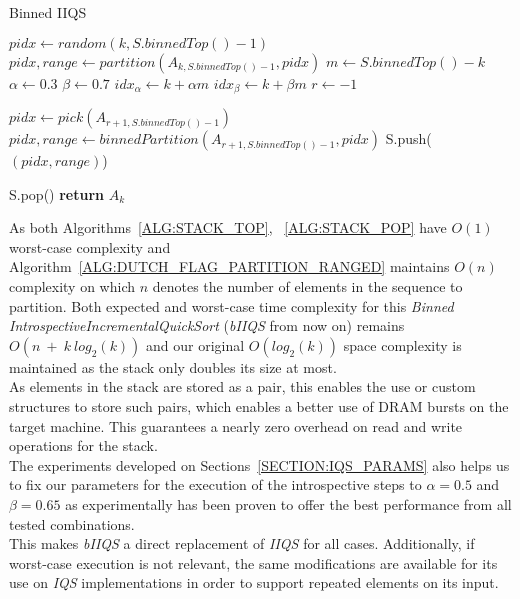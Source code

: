 \begin{algorithm}
  \begin{algorithmic}[1]
    \caption{Binned IIQS} \label{ALG:RANGED_IIQS}
        \State $pidx \gets random(k,S.binnedTop()-1)$
        \State $pidx, range \gets partition(A_{k,S.binnedTop()-1}, pidx)$
        \State $m \gets S.binnedTop() - k$
        \State $\alpha \gets 0.3$
        \State $\beta \gets 0.7$
        \State $idx_\alpha \gets k + \alpha m$
        \State $idx_\beta \gets k + \beta m$
        \State $r \gets -1$

            \State $pidx \gets pick(A_{r+1,S.binnedTop()-1})$
            \State $pidx, range \gets binnedPartition(A_{r+1,S.binnedTop()-1},pidx)$
        \EndIf
        \State S.push($(pidx, range)$)

    \EndWhile
    \State S.pop()
    \State \textbf{return} $A_{k}$\label{RANGED_IIQS}
    \EndProcedure
  \end{algorithmic}
\end{algorithm}

As both Algorithms~\ref{ALG:STACK_TOP}, ~\ref{ALG:STACK_POP} have $O(1)$ worst-case complexity and Algorithm~\ref{ALG:DUTCH_FLAG_PARTITION_RANGED} maintains $O(n)$ complexity on which $n$ denotes the number of elements in the sequence to partition. Both expected and worst-case time complexity for this \emph{Binned IntrospectiveIncrementalQuickSort} (\emph{bIIQS} from now on) remains $O(n~+~k~log_2(k))$ and our original $O(log_2(k))$ space complexity is maintained as the stack only doubles its size at most.\\

As elements in the stack are stored as a pair, this enables the use or custom structures to store such pairs, which enables a better use of DRAM bursts on the target machine. This guarantees a nearly zero overhead on read and write operations for the stack.\\

The experiments developed on Sections~\ref{SECTION:IQS_PARAMS} also helps us to fix our parameters for the execution of the introspective steps to $\alpha=0.5$ and $\beta=0.65$ as experimentally has been proven to offer the best performance from all tested combinations.\\

This makes \emph{bIIQS} a direct replacement of \emph{IIQS} for all cases. Additionally, if worst-case execution is not relevant, the same modifications are available for its use on \emph{IQS} implementations in order to support repeated elements on its input.\\

